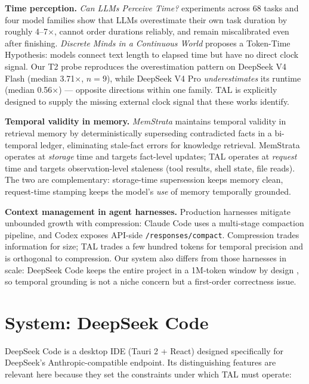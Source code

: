 \documentclass[10pt]{article}
\begin{document}
\textbf{Time perception.} \emph{Can LLMs Perceive Time?} \cite{perceive_time}
experiments across 68 tasks and four model families show that LLMs overestimate their
own task duration by roughly 4--7$\times$, cannot order durations reliably, and remain
miscalibrated even after finishing. \emph{Discrete Minds in a Continuous World}
\cite{token_time} proposes a Token-Time Hypothesis: models connect text length to
elapsed time but have no direct clock signal. Our T2 probe reproduces the
overestimation pattern on DeepSeek V4 Flash (median 3.71$\times$, $n{=}9$), while
DeepSeek V4 Pro \emph{underestimates} its runtime (median 0.56$\times$) ---
opposite directions within one family. TAL is explicitly designed to supply the
missing external clock signal that these works identify.

\textbf{Temporal validity in memory.} \emph{MemStrata} \cite{memstrata} maintains
temporal validity in retrieval memory by deterministically superseding contradicted
facts in a bi-temporal ledger, eliminating stale-fact errors for knowledge
retrieval. MemStrata operates at \emph{storage} time and targets fact-level updates;
TAL operates at \emph{request} time and targets observation-level staleness (tool
results, shell state, file reads). The two are complementary: storage-time
supersession keeps memory clean, request-time stamping keeps the model's \emph{use}
of memory temporally grounded.

\textbf{Context management in agent harnesses.} Production harnesses mitigate
unbounded growth with compression: Claude Code uses a multi-stage compaction
pipeline, and Codex exposes API-side \texttt{/responses/compact}. Compression trades
information for size; TAL trades a few hundred tokens for temporal precision and is
orthogonal to compression. Our system also differs from those harnesses in scale:
DeepSeek Code keeps the entire project in a 1M-token window by design
\cite{deepseek_context}, so temporal grounding is not a niche concern but a
first-order correctness issue.

\section{System: DeepSeek Code}
\label{sec:system}

DeepSeek Code is a desktop IDE (Tauri 2 + React) designed specifically for
DeepSeek's Anthropic-compatible endpoint. Its distinguishing features are relevant
here because they set the constraints under which TAL must operate:
\end{document}
